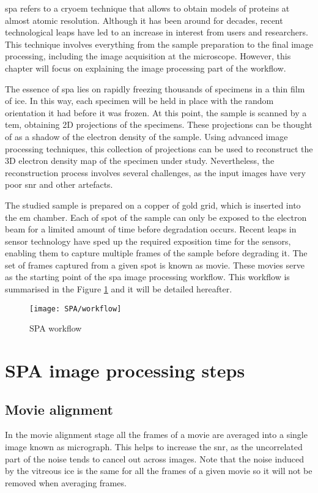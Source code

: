 \documentclass[../main.tex]{subfiles}
\begin{document}
\Gls{spa} refers to a \gls{cryoem} technique that allows to obtain models of proteins at almost atomic resolution. Although it has been around for decades, recent technological leaps have led to an increase in interest from users and researchers. This technique involves everything from the sample preparation to the final image processing, including the image acquisition at the microscope\cite{dimitry2019}. However, this chapter will focus on explaining the image processing part of the workflow.

The essence of \gls{spa} lies on rapidly freezing thousands of specimens in a thin film of ice. In this way, each specimen will be held in place with the random orientation it had before it was frozen. At this point, the sample is scanned by a \gls{tem}, obtaining 2D projections of the specimens. These projections can be thought of as a shadow of the electron density of the sample. Using advanced image processing techniques, this collection of projections can be used to reconstruct the 3D electron density map of the specimen under study. Nevertheless, the reconstruction process involves several challenges, as the input images have very poor \gls{snr} and other artefacts.

The studied sample is prepared on a copper of gold grid, which is inserted into the \gls{em} chamber. Each of spot of the sample can only be exposed to the electron beam for a limited amount of time before degradation occurs. Recent leaps in sensor technology have sped up the required exposition time for the sensors, enabling them to capture multiple frames of the sample before degrading it. The set of frames captured from a given spot is known as movie. These movies serve as the starting point of the \gls{spa} image processing workflow. This workflow is summarised in the Figure \ref{fig:2:spa_workflow} and it will be detailed hereafter. 

\begin{landscape}
    \begin{figure}
        \centering
        \texttt{[image: SPA/workflow]}
        \caption{SPA workflow}
        \label{fig:2:spa_workflow}
    \end{figure}
\end{landscape}

\section{SPA image processing steps}

\subsection{Movie alignment}
In the movie alignment stage all the frames of a movie are averaged into a single image known as micrograph. This helps to increase the \gls{snr}, as the uncorrelated part of the noise tends to cancel out across images. Note that the noise induced by the vitreous ice is the same for all the frames of a given movie so it will not be removed when averaging frames. 
\end{document}
